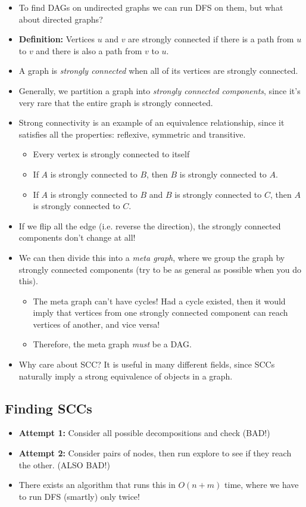 	\begin{itemize}
		\item To find DAGs on undirected graphs we can run DFS on them, but what about directed graphs? 
		\item \textbf{Definition:} Vertices $u$ and $v$ are strongly connected if there is a path from $u$ to 
			$v$ and there is also a path from $v$ to $u$. 
		\item A graph is \textit{strongly connected} when all of its vertices are strongly connected.
		\item Generally, we partition a graph into \textit{strongly connected components}, since it's very rare
			that the 
			entire graph is strongly connected.
		\item Strong connectivity is an example of an equivalence relationship, since it satisfies all 
			the properties: reflexive, symmetric and transitive.
			\begin{itemize}
				\item Every vertex is strongly connected to itself
				\item If $A$ is strongly connected to $B$, then $B$ is strongly connected to $A$. 
				\item If $A$ is strongly connected to $B$ and $B$ is strongly connected to $C$, then $A$ 
					is strongly connected to $C$.
			\end{itemize}
		\item If we flip all the edge (i.e. reverse the direction), the strongly connected components don't 
			change at all! 
		\item We can then divide this into a \textit{meta graph}, where we group the graph by strongly 
			connected components (try to be as general as possible when you do this).
			\begin{itemize}
				\item The meta graph can't have cycles! Had a cycle existed, then it would imply that vertices 
					from one strongly connected component can reach vertices of another, and vice versa!
				\item Therefore, the meta graph \textit{must} be a DAG.
			\end{itemize}
		\item Why care about SCC? It is useful in many different fields, since SCCs naturally imply 
			a strong equivalence of objects in a graph.
	\end{itemize}
	\subsection{Finding SCCs}
	\begin{itemize}
		\item \textbf{Attempt 1:} Consider all possible decompositions and check (BAD!)
		\item \textbf{Attempt 2:} Consider pairs of nodes, then run explore to see if they reach the other. 
			(ALSO BAD!)
		\item There exists an algorithm that runs this in $O(n + m)$ time, where we have to run DFS (smartly) 
			only twice!
	\end{itemize}
